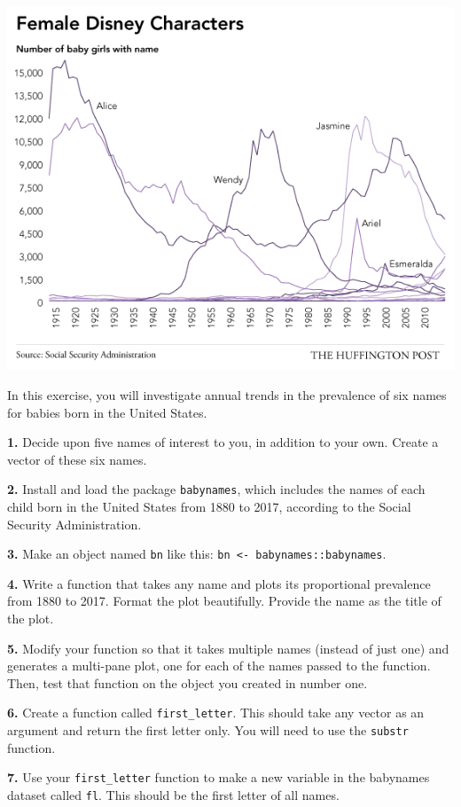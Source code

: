 \documentclass[]{book}
\begin{document}
\includegraphics{img/baby_names.png}

In this exercise, you will investigate annual trends in the prevalence of six names for babies born in the United States.

\textbf{1.} Decide upon five names of interest to you, in addition to your own. Create a vector of these six names.

\textbf{2.} Install and load the package \texttt{babynames}, which includes the names of each child born in the United States from 1880 to 2017, according to the Social Security Administration.

\textbf{3.} Make an object named \texttt{bn} like this: \texttt{bn\ \textless{}-\ babynames::babynames}.

\textbf{4.} Write a function that takes any name and plots its proportional prevalence from 1880 to 2017. Format the plot beautifully. Provide the name as the title of the plot.

\textbf{5.} Modify your function so that it takes multiple names (instead of just one) and generates a multi-pane plot, one for each of the names passed to the function. Then, test that function on the object you created in number one.

\textbf{6.} Create a function called \texttt{first\_letter}. This should take any vector as an argument and return the first letter only. You will need to use the \texttt{substr} function.

\textbf{7.} Use your \texttt{first\_letter} function to make a new variable in the babynames dataset called \texttt{fl}. This should be the first letter of all names.
\end{document}
